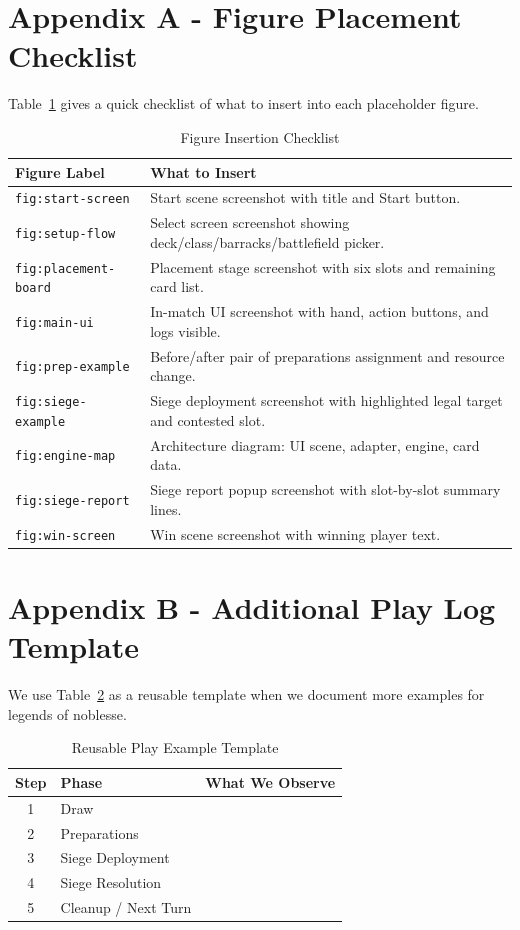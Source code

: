 \documentclass[12pt]{article}
\newcommand{\GameName}{legends of noblesse}
\begin{document}
\newpage
\appendix
\section{Appendix A - Figure Placement Checklist}
Table~\ref{tab:figure-checklist} gives a quick checklist of what to insert into each placeholder figure.

\begin{table}[H]
\centering
\caption{Figure Insertion Checklist}
\label{tab:figure-checklist}
\begin{tabular}{|p{3.2cm}|p{8.5cm}|}
\hline
\textbf{Figure Label} & \textbf{What to Insert} \\
\hline
\texttt{fig:start-screen} & Start scene screenshot with title and Start button. \\
\hline
\texttt{fig:setup-flow} & Select screen screenshot showing deck/class/barracks/battlefield picker. \\
\hline
\texttt{fig:placement-board} & Placement stage screenshot with six slots and remaining card list. \\
\hline
\texttt{fig:main-ui} & In-match UI screenshot with hand, action buttons, and logs visible. \\
\hline
\texttt{fig:prep-example} & Before/after pair of preparations assignment and resource change. \\
\hline
\texttt{fig:siege-example} & Siege deployment screenshot with highlighted legal target and contested slot. \\
\hline
\texttt{fig:engine-map} & Architecture diagram: UI scene, adapter, engine, card data. \\
\hline
\texttt{fig:siege-report} & Siege report popup screenshot with slot-by-slot summary lines. \\
\hline
\texttt{fig:win-screen} & Win scene screenshot with winning player text. \\
\hline
\end{tabular}
\end{table}

\section{Appendix B - Additional Play Log Template}
We use Table~\ref{tab:play-log-template} as a reusable template when we document more examples for \GameName.

\begin{table}[H]
\centering
\caption{Reusable Play Example Template}
\label{tab:play-log-template}
\begin{tabular}{|c|p{3.1cm}|p{7.2cm}|}
\hline
\textbf{Step} & \textbf{Phase} & \textbf{What We Observe} \\
\hline
1 & Draw &  \\
\hline
2 & Preparations &  \\
\hline
3 & Siege Deployment &  \\
\hline
4 & Siege Resolution &  \\
\hline
5 & Cleanup / Next Turn &  \\
\hline
\end{tabular}
\end{table}
\end{document}
